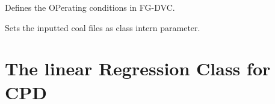 \documentclass[letterpaper,10pt,english]{sphinxmanual}
\begin{document}
\begin{fulllineitems}
\begin{fulllineitems}
\end{fulllineitems}


\begin{fulllineitems}
\label{Appendix:FGDVC_Fit_lin_regr.Process.setConditions}
Defines the OPerating conditions in FG-DVC.

\end{fulllineitems}


\begin{fulllineitems}
\label{Appendix:FGDVC_Fit_lin_regr.Process.setFiles}
Sets the inputted coal files as class intern parameter.

\end{fulllineitems}


\end{fulllineitems}



\section{The linear Regression Class for CPD}
\label{Appendix:the-linear-regression-class-for-cpd}
\end{document}
